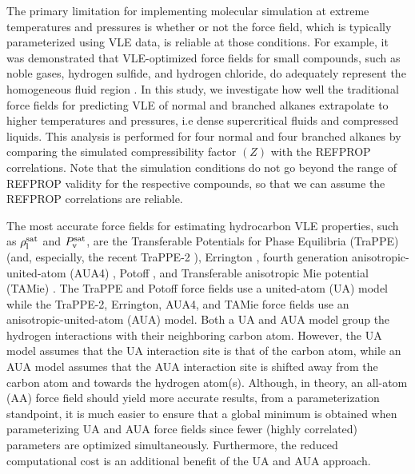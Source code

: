 \documentclass[preprint,letterpaper,floatfix,citeautoscript,aip,jcp]{revtex4-1}
\begin{document}
The primary limitation for implementing molecular simulation at extreme temperatures and pressures is whether or not the force field, which is typically parameterized using VLE data, is reliable at those conditions.  
For example, it was demonstrated that VLE-optimized force fields for small compounds, such as noble gases, hydrogen sulfide, and hydrogen chloride, do adequately represent the homogeneous fluid region \cite{Rutkai2013}. In this study, we investigate how well the traditional force fields for predicting VLE of normal and branched alkanes extrapolate to higher temperatures and pressures, i.e dense supercritical fluids and compressed liquids. This analysis is performed for four normal and four branched alkanes by comparing the simulated compressibility factor $(Z)$ with the REFPROP correlations. Note that the simulation conditions do not go beyond the range of 
REFPROP
validity for the respective compounds, so that we can assume the REFPROP correlations are reliable.

The most accurate force fields for estimating hydrocarbon VLE properties, such as $\rho_{\rm l}^{\rm sat}$ and $P_{\rm v}^{\rm sat}$, are the Transferable Potentials for Phase Equilibria (TraPPE) \cite{TraPPE,Martin1999} (and, especially, the recent TraPPE-2 \cite{TraPPEUA2}), Errington \cite{Exp6}, fourth generation anisotropic-united-atom (AUA4) \cite{AUA4,Bourasseau2002}, Potoff \cite{Mie,Potoff_branched}, and Transferable anisotropic Mie potential (TAMie) \cite{TAMie,Weidler2016}. The TraPPE and Potoff force fields use a united-atom (UA) model while the TraPPE-2, Errington, AUA4, and TAMie force fields use an anisotropic-united-atom (AUA) model. Both a UA and AUA model group the hydrogen interactions with their neighboring carbon atom. However, the UA model assumes that the UA interaction site is that of the carbon atom, while an AUA model assumes that the AUA interaction site is shifted away from the carbon atom and towards the hydrogen atom(s). Although, in theory, an all-atom (AA) force field should yield more accurate results, from a parameterization standpoint, it is much easier to ensure that a global minimum is obtained when parameterizing UA and AUA force fields since fewer (highly correlated) parameters are optimized simultaneously. Furthermore, the reduced computational cost is an additional benefit of the UA and AUA approach.
\end{document}

